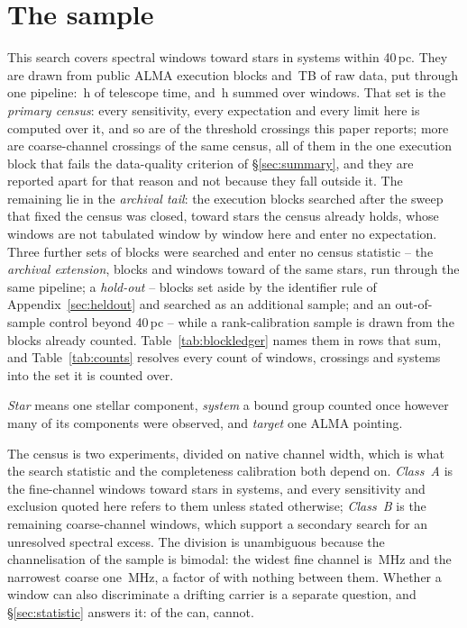 \section{The sample}
\label{sec:sample}

This search covers \NWindows{} spectral windows toward \NStars{} stars in
\NSystems{} systems within 40\,pc. They are drawn from \NEB{} public ALMA
execution blocks and \TotalDataTB\,TB of raw data, put through one
pipeline: \StTelHours\,h of telescope time, and \LdgCensusHours\,h summed
over windows. That set is the \emph{primary census}: every
sensitivity, every expectation and every limit here is computed over it, and
so are \MtCrossACen{} of the \EvNCrossRaw{} threshold crossings this paper
reports; \LdgNCrossB{} more are coarse-channel crossings of the same census,
all of them in the one execution block that fails the data-quality criterion
of \S\ref{sec:summary}, and they are reported apart for that reason and not
because they fall outside it. The remaining \CeNTailCross{} lie in the
\emph{archival tail}: the \LdgExtTail{} execution blocks searched after the
sweep that fixed the census was closed, toward stars the census already holds,
whose \LdgExtTailWin{} windows are not tabulated window by window here and
enter no expectation. Three further sets of blocks were searched and enter no
census statistic -- the \emph{archival extension}, \LdgExtEB{} blocks and
\LdgExtWin{} windows toward \LdgExtStars{} of the same stars, run through the
same pipeline; a
\emph{hold-out} -- blocks set aside by the identifier rule of
Appendix~\ref{sec:heldout} and searched as an additional sample;
and an out-of-sample control beyond 40\,pc -- while a rank-calibration sample
is drawn from the blocks already counted.
Table~\ref{tab:blockledger} names them in rows that sum, and
Table~\ref{tab:counts} resolves every count of windows, crossings and systems
into the set it is counted over.

\emph{Star} means one stellar component, \emph{system} a bound group
counted once however many of its components were observed, and \emph{target}
one ALMA pointing.

The census is two experiments, divided on native channel width, which is
what the search statistic and the completeness calibration both depend on.
\emph{Class~A} is the \NWinA{} fine-channel windows toward
\LdgClassAStars{} stars in \NSysClassA{} systems, and every sensitivity and
exclusion quoted here refers to them unless stated otherwise;
\emph{Class~B} is the remaining \NWinB{} coarse-channel windows, which
support a secondary search for an unresolved spectral excess. The division
is unambiguous because the channelisation of the sample is bimodal: the
widest fine channel is \ScChanFineMaxMHz\,MHz and the narrowest coarse one
\ScChanCoarseMinMHz\,MHz, a factor of \ScChanGapFac{} with nothing between
them. Whether a window can also discriminate a drifting carrier is a
separate question, and \S\ref{sec:statistic} answers it: \EtaDriftAOk{} of
the \NWinA{} can, \EtaDriftALo{} cannot.

